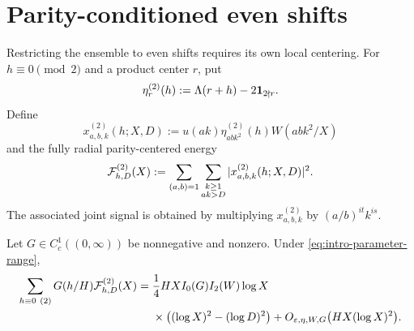 \section{Parity-conditioned even shifts}
\label{sec:even-shifts}

Restricting the ensemble to even shifts requires its own local centering.
For $h\equiv0\pmod2$ and a product center $r$, put
\begin{equation}
 \eta_r^{(2)}(h)
 :=\Lambda(r+h)-2\mathbf 1_{2\nmid r}.
 \label{eq:parity-centered-target}
\end{equation}
Define
\begin{equation}
 x^{(2)}_{a,b,k}(h;X,D)
 :=u(ak)\eta_{abk^2}^{(2)}(h)W(abk^2/X)
 \label{eq:even-radial-coefficient}
\end{equation}
and the fully radial parity-centered energy
\begin{equation}
 \mathcal F^{(2)}_{h,D}(X)
 :=\sum_{(a,b)=1}\sum_{\substack{k\geq1\\ak>D}}
 |x^{(2)}_{a,b,k}(h;X,D)|^2.
 \label{eq:even-radial-energy}
\end{equation}
The associated joint signal is obtained by multiplying
$x^{(2)}_{a,b,k}$ by $(a/b)^{it}k^{is}$.

\begin{theorem}
\label{thm:short-even-radial-energy}
Let $G\in C_c^1((0,\infty))$ be nonnegative and nonzero.  Under
\eqref{eq:intro-parameter-range},
\begin{equation}
 \begin{aligned}
 \sum_{h\equiv0\ (2)}G(h/H)\mathcal F^{(2)}_{h,D}(X)
 ={}&\frac14HX I_0(G)I_2(W)\log X\\
 &\times\bigl((\log X)^2-(\log D)^2\bigr)
 +O_{\varepsilon,\eta,W,G}\bigl(HX(\log X)^2\bigr).
 \end{aligned}
 \label{eq:short-even-radial-energy}
\end{equation}
\end{theorem}

